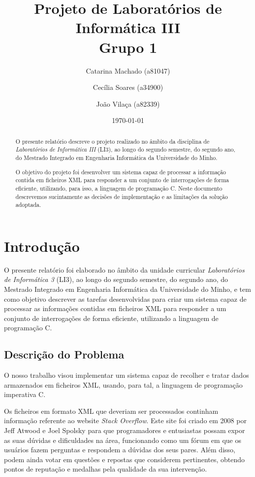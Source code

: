 \documentclass[a4paper]{report}
\title{Projeto de Laboratórios de Informática III\\Grupo 1}
\author{Catarina Machado (a81047) \and Cecília Soares (a34900) \and João Vilaça (a82339)}
\date{\today}
\begin{document}
\maketitle

\begin{abstract}
O presente relatório descreve o projeto realizado no âmbito da disciplina de
\emph {Laboratórios de Informática III} (LI3), ao longo do segundo semestre,
do segundo ano, do Mestrado Integrado em Engenharia Informática da Universidade
do Minho.

O objetivo do projeto foi desenvolver um sistema capaz de processar a informação
contida em ficheiros XML para responder a um conjunto de interrogações de forma
eficiente, utilizando, para isso, a linguagem de programação C. Neste documento
descrevemos sucintamente as decisões de implementação e as limitações da solução
adoptada.

\end{abstract}

\tableofcontents

\chapter{Introdução}
\label{ch:intro}

O presente relatório foi elaborado no âmbito da unidade curricular \emph {Laboratórios
de Informática 3} (LI3), ao longo do segundo semestre, do segundo ano, do Mestrado
Integrado em Engenharia Informática da Universidade do Minho, e tem como objetivo
descrever as tarefas desenvolvidas para criar um sistema capaz de processar as
informações contidas em ficheiros XML para responder a um conjunto de
interrogações de forma eficiente, utilizando a linguagem de programação C.


\section{Descrição do Problema}
\label{sec:problema}

O nosso trabalho visou implementar um sistema capaz de recolher e tratar dados
armazenados em ficheiros XML, usando, para tal, a linguagem de programação
imperativa C.

Os ficheiros em formato XML que deveriam ser processados continham informação referente ao
website \textit{Stack Overflow}. Este site foi criado em 2008 por Jeff Atwood e Joel
Spolsky para que programadores e entusiastas possam expor as suas dúvidas e
dificuldades na área, funcionando como um fórum em que os usuários fazem
perguntas e respondem a dúvidas dos seus pares. Além disso, podem ainda votar
em questões e repostas que considerem pertinentes, obtendo pontos de reputação
e medalhas pela qualidade da sua intervenção.
\end{document}
